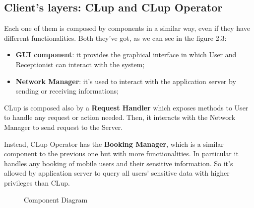 \subsection{Client's layers: CLup and CLup Operator}
Each one of them is composed by components in a similar way, even if they have different functionalities.
Both they've got, as we can see in the figure 2.3:
\begin{itemize} 
\item \textbf{GUI component}: it provides the graphical interface in which User and Receptionist can interact with the system;
\item \textbf{Network Manager}: it's used to interact with the application server by sending or receiving informations; 
\end{itemize}


CLup is composed also by a \textbf{Request Handler} which exposes methods to User to handle any request or action needed. Then, it interacts with the Network Manager to send request to the Server. \par
Instead, CLup Operator has the \textbf{Booking Manager}, which is a similar component to the previous one but with more functionalities. In particular it handles any booking of mobile users and their sensitive information. So it's allowed by application server to query all users' sensitive data with higher privileges than CLup. \par




\begin{figure}[h]
  \label{component_diagram}
  \centering
    \caption{Component Diagram}
\end{figure}



